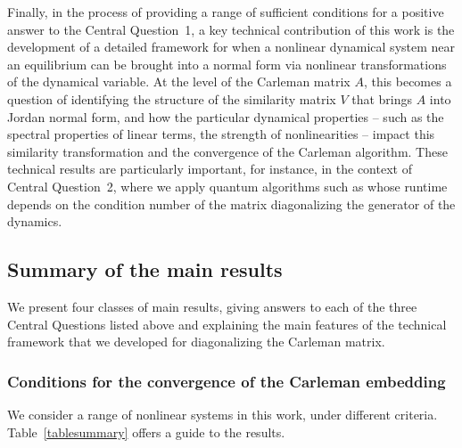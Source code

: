 \documentclass[superscriptaddress,onecolumn,nofootinbib,longbibliography,a4paper,accepted=2026-09-29]{quantumarticle}
\theoremstyle{plain}
\theoremstyle{definition}
\numberwithin{thm}{section}
\numberwithin{assumption}{section}
\numberwithin{lemma}{section}
\numberwithin{prop}{section}
\numberwithin{cor}{section}
\numberwithin{definition}{section}
\numberwithin{rmk}{section}
\numberwithin{equation}{section}
\begin{document}
Finally, in the process of providing a range of sufficient conditions for a positive answer to the Central Question~1, a key technical contribution of this work is the development of a detailed framework for when a nonlinear dynamical system near an equilibrium can be brought into a normal form via nonlinear transformations of the dynamical variable. At the level of the Carleman matrix $A$, this becomes a question of identifying the structure of the similarity matrix $V$ that brings $A$ into Jordan normal form, and how the particular dynamical properties -- such as the spectral properties of linear terms, the strength of nonlinearities -- impact this similarity transformation and the convergence of the Carleman algorithm. These technical results are particularly important, for instance, in the context of Central Question~2, where we apply quantum algorithms such as \cite{berry2017quantum} whose runtime depends on the condition number of the matrix diagonalizing the generator of the dynamics.



\subsection{Summary of the main results}

We present four classes of main results, giving answers to each of the three Central Questions listed above and explaining the main features of the technical framework that we developed for diagonalizing the Carleman matrix.


\subsubsection{Conditions for the convergence of the Carleman  embedding}
\label{sec:summary_carleman}

We consider a range of nonlinear systems in this work, under different criteria. Table~\ref{tablesummary} offers a guide to the results.
\end{document}
